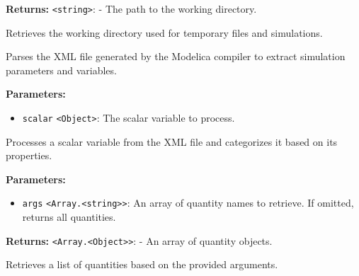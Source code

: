 \documentclass[12pt,a4paper]{article}
\begin{document}
\vspace{5mm}
\noindent {}


\noindent \textbf{Returns:} \texttt{<string>}: - The path to the working directory.

\noindent Retrieves the working directory used for temporary files and simulations.

\vspace{5mm}
\noindent {}


\noindent Parses the XML file generated by the Modelica compiler to extract simulation parameters and variables.

\vspace{5mm}
\noindent {}


\noindent \textbf{Parameters:}
\begin{itemize}
  \item \texttt{scalar} \texttt{<Object>}: The scalar variable to process.
\end{itemize}

\noindent Processes a scalar variable from the XML file and categorizes it based on its properties.

\vspace{5mm}
\noindent {}


\noindent \textbf{Parameters:}
\begin{itemize}
  \item \texttt{args} \texttt{<Array.<string>>}: An array of quantity names to retrieve. If omitted, returns all quantities.
\end{itemize}

\noindent \textbf{Returns:} \texttt{<Array.<Object>>}: - An array of quantity objects.

\noindent Retrieves a list of quantities based on the provided arguments.

\vspace{5mm}
\noindent {}
\end{document}
